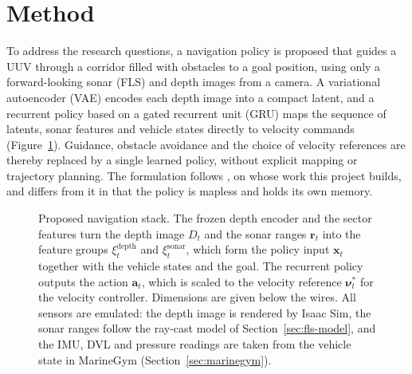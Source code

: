 \section{Method}
\label{sec:method}

To address the research questions, a navigation policy is proposed that guides a UUV through a corridor filled with obstacles to a goal position, using only a forward-looking sonar (FLS) and depth images from a camera. A variational autoencoder (VAE) encodes each depth image into a compact latent, and a recurrent policy based on a gated recurrent unit (GRU) maps the sequence of latents, sonar features and vehicle states directly to velocity commands (Figure~\ref{fig:nav-stack-online}). Guidance, obstacle avoidance and the choice of velocity references are thereby replaced by a single learned policy, without explicit mapping or trajectory planning. The formulation follows \textcite{deowan2026unified}, on whose work this project builds, and differs from it in that the policy is mapless and holds its own memory.

\begin{figure}[ht]
    \centering
    
    \caption{Proposed navigation stack. The frozen depth encoder and the sector features turn the depth image $D_t$ and the sonar ranges $\mathbf{r}_t$ into the feature groups $\xi^{\mathrm{depth}}_t$ and $\xi^{\mathrm{sonar}}_t$, which form the policy input $\mathbf{x}_t$ together with the vehicle states and the goal. The recurrent policy outputs the action $\mathbf{a}_t$, which is scaled to the velocity reference $\boldsymbol{\nu}^{*}_t$ for the velocity controller. Dimensions are given below the wires. All sensors are emulated: the depth image is rendered by Isaac Sim, the sonar ranges follow the ray-cast model of Section~\ref{sec:fls-model}, and the IMU, DVL and pressure readings are taken from the vehicle state in MarineGym (Section~\ref{sec:marinegym}).}
    \label{fig:nav-stack-online}
\end{figure}

